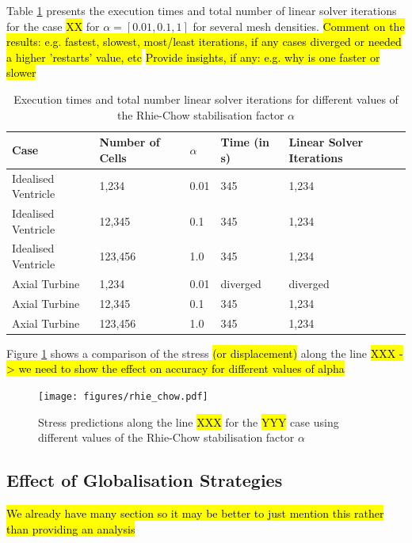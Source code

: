 \documentclass[sn-mathphys,Numbered,draft]{sn-jnl}%
\begin{document}
Table \ref{tab:rhie_chow} presents the execution times and total number of linear solver iterations for the case \hl{XX} for $\alpha = \left[ 0.01, 0.1, 1 \right]$ for several mesh densities.
\hl{Comment on the results: e.g. fastest, slowest, most/least iterations, if any cases diverged or needed a higher 'restarts' value, etc}
\hl{Provide insights, if any: e.g. why is one faster or slower}
\begin{table}[htb]
	\centering
		\begin{tabular}{lllll}
			\hline
			Case & Number of Cells & $\alpha$ & Time (in s) & Linear Solver Iterations  \\
			\hline 
			Idealised Ventricle & 1,234 & 0.01 & 345 & 1,234  \\
			Idealised Ventricle & 12,345 & 0.1 & 345 & 1,234  \\
			Idealised Ventricle & 123,456 & 1.0 & 345 & 1,234  \\
			Axial Turbine & 1,234 & 0.01 & diverged & diverged  \\
			Axial Turbine & 12,345 & 0.1 & 345 & 1,234  \\
			Axial Turbine & 123,456 & 1.0 & 345 & 1,234  \\
			\hline
		\end{tabular}
	\caption{Execution times and total number linear solver iterations for different values of the Rhie-Chow stabilisation factor $\alpha$}
	\label{tab:rhie_chow}
\end{table}

Figure \ref{fig:rhie_chow} shows a comparison of the stress \hl{(or displacement)} along the line \hl{XXX -> we need to show the effect on accuracy for different values of alpha}
\begin{figure}[htbp]
   \centering
   \texttt{[image: figures/rhie\_chow.pdf]} 
   \caption{Stress predictions along the line \hl{XXX} for the \hl{YYY} case using different values of the Rhie-Chow stabilisation factor $\alpha$}
   \label{fig:rhie_chow}
\end{figure}


\subsection{Effect of Globalisation Strategies}
\hl{We already have many section so it may be better to just mention this rather than providing an analysis}
\end{document}
